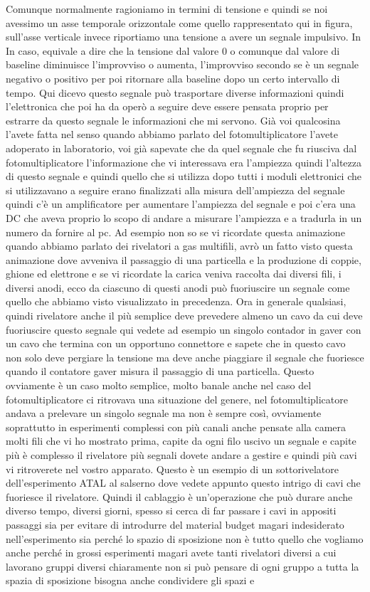 Comunque normalmente ragioniamo in termini di tensione e quindi se noi avessimo un asse temporale orizzontale come quello rappresentato qui in figura, sull'asse verticale invece riportiamo una tensione a avere un segnale impulsivo. In In caso, equivale a dire che la tensione dal valore 0 o comunque dal valore di baseline diminuisce l'improvviso o aumenta, l'improvviso secondo se è un segnale negativo o positivo per poi ritornare alla baseline dopo un certo intervallo di tempo. Qui dicevo questo segnale può trasportare diverse informazioni quindi l'elettronica che poi ha da operò a seguire deve essere pensata proprio per estrarre da questo segnale le informazioni che mi servono. Già voi qualcosina l'avete fatta nel senso quando abbiamo parlato del fotomultiplicatore l'avete adoperato in laboratorio, voi già sapevate che da quel segnale che fu riusciva dal fotomultiplicatore l'informazione che vi interessava era l'ampiezza quindi l'altezza di questo segnale e quindi quello che si utilizza dopo tutti i moduli elettronici che si utilizzavano a seguire erano finalizzati alla misura dell'ampiezza del segnale quindi c'è un amplificatore per aumentare l'ampiezza del segnale e poi c'era una DC che aveva proprio lo scopo di andare a misurare l'ampiezza e a tradurla in un numero da fornire al pc. Ad esempio non so se vi ricordate questa animazione quando abbiamo parlato dei rivelatori a gas multifili, avrò un fatto visto questa animazione dove avveniva il passaggio di una particella e la produzione di coppie, ghione ed elettrone e se vi ricordate la carica veniva raccolta dai diversi fili, i diversi anodi, ecco da ciascuno di questi anodi può fuoriuscire un segnale come quello che abbiamo visto visualizzato in precedenza. Ora in generale qualsiasi, quindi rivelatore anche il più semplice deve prevedere almeno un cavo da cui deve fuoriuscire questo segnale qui vedete ad esempio un singolo contador in gaver con un cavo che termina con un opportuno connettore e sapete che in questo cavo non solo deve pergiare la tensione ma deve anche piaggiare il segnale che fuoriesce quando il contatore gaver misura il passaggio di una particella. Questo ovviamente è un caso molto semplice, molto banale anche nel caso del fotomultiplicatore ci ritrovava una situazione del genere, nel fotomultiplicatore andava a prelevare un singolo segnale ma non è sempre così, ovviamente soprattutto in esperimenti complessi con più canali anche pensate alla camera molti fili che vi ho mostrato prima, capite da ogni filo uscivo un segnale e capite più è complesso il rivelatore più segnali dovete andare a gestire e quindi più cavi vi ritroverete nel vostro apparato. Questo è un esempio di un sottorivelatore dell'esperimento ATAL al salserno dove vedete appunto questo intrigo di cavi che fuoriesce il rivelatore. Quindi il cablaggio è un'operazione che può durare anche diverso tempo, diversi giorni, spesso si cerca di far passare i cavi in appositi passaggi sia per evitare di introdurre del material budget magari indesiderato nell'esperimento sia perché lo spazio di sposizione non è tutto quello che vogliamo anche perché in grossi esperimenti magari avete tanti rivelatori diversi a cui lavorano gruppi diversi chiaramente non si può pensare di ogni gruppo a tutta la spazia di sposizione bisogna anche condividere gli spazi e 